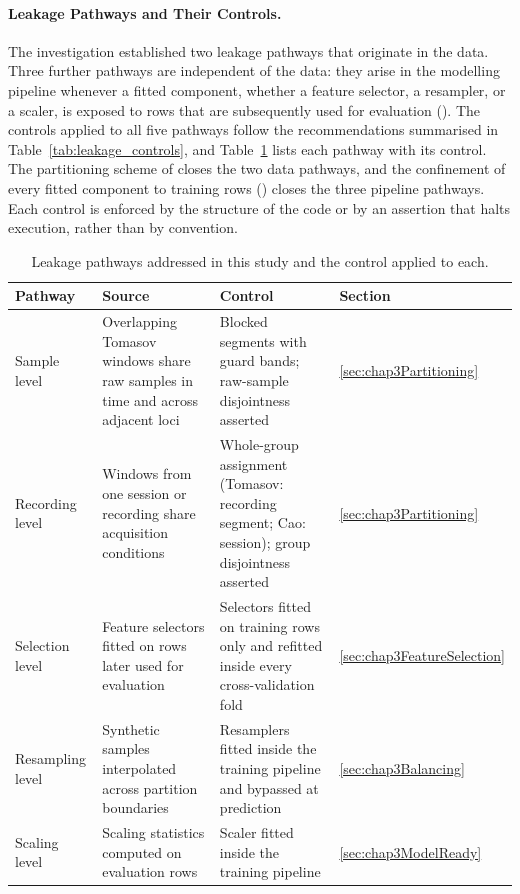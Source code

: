 \paragraph[Leakage Pathways and Their Controls]{Leakage Pathways and Their Controls.}
The investigation established two leakage pathways that originate in the data. Three further pathways are independent of the data: they arise in the modelling pipeline whenever a fitted component, whether a feature selector, a resampler, or a scaler, is exposed to rows that are subsequently used for evaluation (). The controls applied to all five pathways follow the recommendations summarised in Table~\ref{tab:leakage_controls}, and Table~\ref{tab:leak_pathways} lists each pathway with its control. The partitioning scheme of  closes the two data pathways, and the confinement of every fitted component to training rows () closes the three pipeline pathways. Each control is enforced by the structure of the code or by an assertion that halts execution, rather than by convention.

\begin{table}[!htbp]
	\centering
	\caption{Leakage pathways addressed in this study and the control applied to each.}
	\label{tab:leak_pathways}
	\small
	\setlength{\tabcolsep}{4pt}
	\begin{tabularx}{\textwidth}{@{}>{\raggedright\arraybackslash}p{2.2cm} >{\raggedright\arraybackslash}X >{\raggedright\arraybackslash}X >{\raggedright\arraybackslash}p{1.9cm}@{}}
		\toprule
		\textbf{Pathway} & \textbf{Source} & \textbf{Control} & \textbf{Section}\\
		\midrule
		Sample level    & Overlapping Tomasov windows share raw samples in time and across adjacent loci & Blocked segments with guard bands; raw-sample disjointness asserted & \ref{sec:chap3Partitioning}\\
		Recording level & Windows from one session or recording share acquisition conditions & Whole-group assignment (Tomasov: recording segment; Cao: session); group disjointness asserted & \ref{sec:chap3Partitioning}\\
		Selection level & Feature selectors fitted on rows later used for evaluation & Selectors fitted on training rows only and refitted inside every cross-validation fold & \ref{sec:chap3FeatureSelection}\\
		Resampling level & Synthetic samples interpolated across partition boundaries & Resamplers fitted inside the training pipeline and bypassed at prediction & \ref{sec:chap3Balancing}\\
		Scaling level   & Scaling statistics computed on evaluation rows & Scaler fitted inside the training pipeline & \ref{sec:chap3ModelReady}\\
		\bottomrule
	\end{tabularx}
\end{table}

